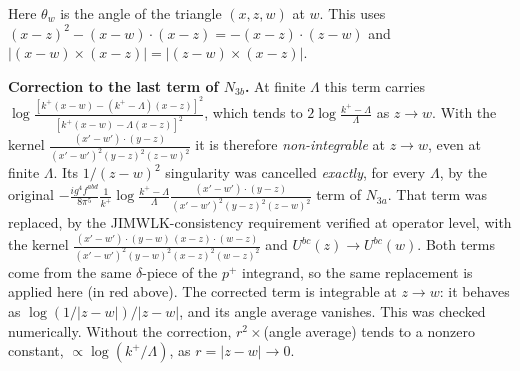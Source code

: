 \documentclass[9pt]{article}
\numberwithin{equation}{section}
\begin{document}
{\color{red}Here $\theta_{w}$ is the angle of the triangle $(x,z,w)$ at $w$. This uses $(x-z)^{2}-(x-w)\cdot(x-z)=-(x-z)\cdot(z-w)$ and $|(x-w)\times(x-z)|=|(z-w)\times(x-z)|$.

\noindent\textbf{Correction to the last term of $N_{3b}$.} At finite $\Lambda$ this term carries $\log\frac{[k^{+}(x-w)-(k^{+}-\Lambda)(x-z)]^{2}}{[k^{+}(x-w)-\Lambda(x-z)]^{2}}$, which tends to $2\log\frac{k^{+}-\Lambda}{\Lambda}$ as $z\to w$. With the kernel $\frac{(x'-w')\cdot(y-z)}{(x'-w')^{2}(y-z)^{2}(z-w)^{2}}$ it is therefore \emph{non-integrable} at $z\to w$, even at finite $\Lambda$. Its $1/(z-w)^{2}$ singularity was cancelled \emph{exactly}, for every $\Lambda$, by the original $-\frac{ig^{4}f^{abd}}{8\pi^{5}}\frac{1}{k^{+}}\log\frac{k^{+}-\Lambda}{\Lambda}\frac{(x'-w')\cdot(y-z)}{(x'-w')^{2}(y-z)^{2}(z-w)^{2}}$ term of $N_{3a}$. That term was replaced, by the JIMWLK-consistency requirement verified at operator level, with the kernel $\frac{(x'-w')\cdot(y-w)\,(x-z)\cdot(w-z)}{(x'-w')^{2}(y-w)^{2}(x-z)^{2}(w-z)^{2}}$ and $U^{bc}(z)\to U^{bc}(w)$. Both terms come from the same $\delta$-piece of the $p^{+}$ integrand, so the same replacement is applied here (in red above). The corrected term is integrable at $z\to w$: it behaves as $\log(1/|z-w|)/|z-w|$, and its angle average vanishes. This was checked numerically. Without the correction, $r^{2}\times$(angle average) tends to a nonzero constant, $\propto\log(k^{+}/\Lambda)$, as $r=|z-w|\to0$.

}
\end{document}
